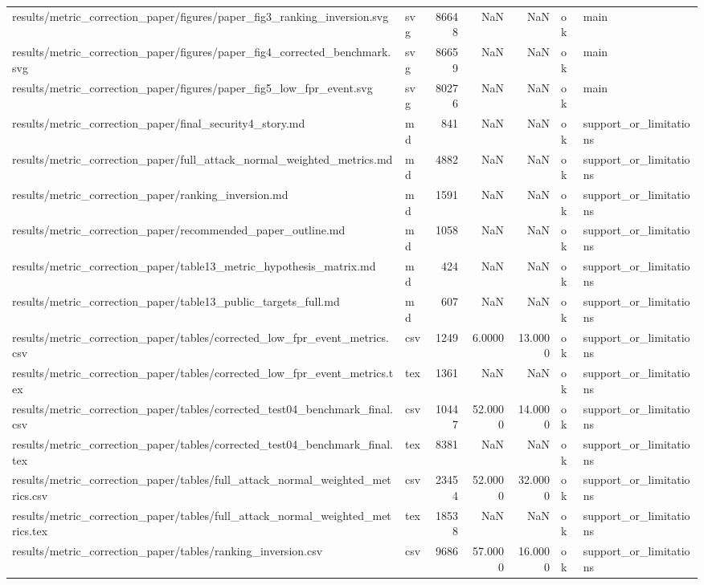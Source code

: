 \begin{tabular}{llrrrll}
results/metric_correction_paper/figures/paper_fig3_ranking_inversion.svg & svg & 86648 & NaN & NaN & ok & main \\
results/metric_correction_paper/figures/paper_fig4_corrected_benchmark.svg & svg & 86659 & NaN & NaN & ok & main \\
results/metric_correction_paper/figures/paper_fig5_low_fpr_event.svg & svg & 80276 & NaN & NaN & ok & main \\
results/metric_correction_paper/final_security4_story.md & md & 841 & NaN & NaN & ok & support_or_limitations \\
results/metric_correction_paper/full_attack_normal_weighted_metrics.md & md & 4882 & NaN & NaN & ok & support_or_limitations \\
results/metric_correction_paper/ranking_inversion.md & md & 1591 & NaN & NaN & ok & support_or_limitations \\
results/metric_correction_paper/recommended_paper_outline.md & md & 1058 & NaN & NaN & ok & support_or_limitations \\
results/metric_correction_paper/table13_metric_hypothesis_matrix.md & md & 424 & NaN & NaN & ok & support_or_limitations \\
results/metric_correction_paper/table13_public_targets_full.md & md & 607 & NaN & NaN & ok & support_or_limitations \\
results/metric_correction_paper/tables/corrected_low_fpr_event_metrics.csv & csv & 1249 & 6.0000 & 13.0000 & ok & support_or_limitations \\
results/metric_correction_paper/tables/corrected_low_fpr_event_metrics.tex & tex & 1361 & NaN & NaN & ok & support_or_limitations \\
results/metric_correction_paper/tables/corrected_test04_benchmark_final.csv & csv & 10447 & 52.0000 & 14.0000 & ok & support_or_limitations \\
results/metric_correction_paper/tables/corrected_test04_benchmark_final.tex & tex & 8381 & NaN & NaN & ok & support_or_limitations \\
results/metric_correction_paper/tables/full_attack_normal_weighted_metrics.csv & csv & 23454 & 52.0000 & 32.0000 & ok & support_or_limitations \\
results/metric_correction_paper/tables/full_attack_normal_weighted_metrics.tex & tex & 18538 & NaN & NaN & ok & support_or_limitations \\
results/metric_correction_paper/tables/ranking_inversion.csv & csv & 9686 & 57.0000 & 16.0000 & ok & support_or_limitations \\

\end{tabular}
